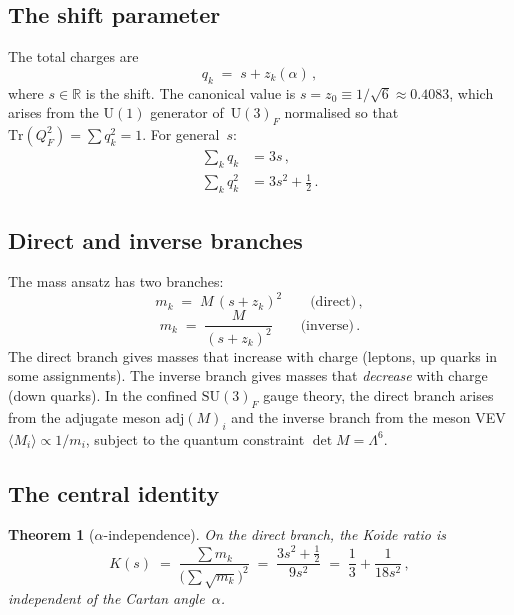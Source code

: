 \documentclass[preprint,12pt]{elsarticle}
\newtheorem{theorem}{Theorem}
\newcommand{\SU}{\mathrm{SU}}
\newcommand{\UU}{\mathrm{U}}
\newcommand{\Tr}{\mathrm{Tr}}
\newcommand{\adj}{\mathrm{adj}}
\begin{document}
\subsection{The shift parameter}

The total charges are
\begin{equation}
  q_k \;=\; s + z_k(\alpha)\,,
  \label{eq:q_def}
\end{equation}
where $s \in \mathbb{R}$ is the shift.
The canonical value is $s = z_0 \equiv 1/\sqrt{6} \approx 0.4083$,
which arises from the $\UU(1)$ generator of~$\UU(3)_F$
normalised so that $\Tr(Q_F^2) = \sum q_k^2 = 1$.
For general~$s$:
\begin{align}
  \sum_k q_k &= 3s\,,
  \label{eq:sum_q}\\
  \sum_k q_k^2 &= 3s^2 + \tfrac{1}{2}\,.
  \label{eq:sum_q2}
\end{align}

\subsection{Direct and inverse branches}

The mass ansatz has two branches:
\begin{equation}
  m_k \;=\; M\,(s + z_k)^2
  \qquad \text{(direct)}\,,
  \label{eq:direct}
\end{equation}
\begin{equation}
  m_k \;=\; \frac{M}{(s + z_k)^2}
  \qquad \text{(inverse)}\,.
  \label{eq:inverse}
\end{equation}
The direct branch gives masses that increase with charge
(leptons, up quarks in some assignments).
The inverse branch gives masses that \emph{decrease}
with charge (down quarks).
In the confined $\SU(3)_F$ gauge theory, the direct branch
arises from the adjugate meson $\adj(M)_i$ and the inverse
branch from the meson VEV $\langle M_i \rangle \propto 1/m_i$,
subject to the quantum constraint $\det M = \Lambda^6$.

\subsection{The central identity}

\begin{theorem}[$\alpha$-independence]
\label{thm:K_s}
On the direct branch, the Koide ratio is
\begin{equation}
  K(s) \;=\; \frac{\sum m_k}{\bigl(\sum \sqrt{m_k}\bigr)^2}
  \;=\; \frac{3s^2 + \tfrac{1}{2}}{9s^2}
  \;=\; \frac{1}{3} + \frac{1}{18s^2}\,,
  \label{eq:K_of_s}
\end{equation}
independent of the Cartan angle~$\alpha$.
\end{theorem}
\end{document}
